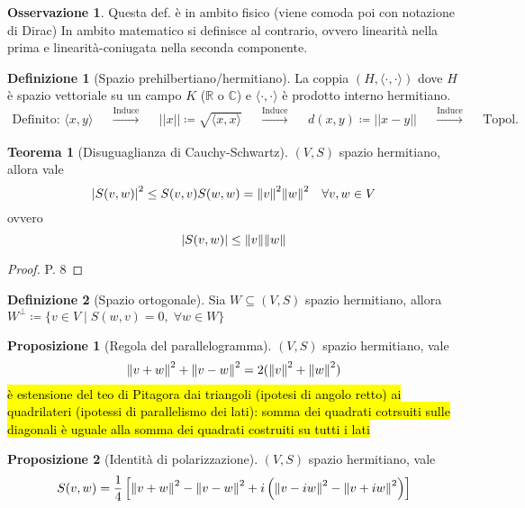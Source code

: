 \documentclass[a4paper,10pt]{article}
\theoremstyle{definition}
\newcommand{\re}{\mathbb{R}} %
\newcommand{\im}{\mathbb{C}} %
\newcommand{\inner}{\langle\cdot{,}\cdot\rangle} %
\newcommand{\inn}[2]{\langle #1, #2 \rangle}
\theoremstyle{indentdefinition}
\newtheorem{defn}{Definizione}[section]
\theoremstyle{indenttheorem}
\newtheorem{thm}{Teorema}
\newtheorem{prop}{Proposizione}
\theoremstyle{myremark}
\newtheorem*{rem*}{Osservazione}
\theoremstyle{indentgeneral}
\begin{document}
\begin{rem*}
    Questa def. è in  ambito fisico (viene comoda poi con notazione di Dirac) In ambito matematico si definisce al contrario, ovvero linearità nella prima e linearità-coniugata nella seconda componente.
\end{rem*}

\begin{defn}[Spazio prehilbertiano/hermitiano]
    La coppia $(H, \inner)$ dove $H$ è spazio vettoriale su un campo $K$ ($\re$ o $\im$)  e $\inner$ è prodotto interno hermitiano. 
    \begin{align*}
        \text{Definito: } \inn{x}{y}  & & \overset{\text{Induce}}{\longrightarrow} 
& & ||x|| \coloneqq \sqrt{\inn{x}{x}} & & \overset{\text{Induce}}{\longrightarrow} & & d(x,y) \coloneqq ||x-y||  & & \overset{\text{Induce}}{\longrightarrow} & & \text{Topol.}
    \end{align*}
\end{defn}

\begin{thm}[Disuguaglianza di Cauchy-Schwartz]\label{thm-dis-cauchy-schwartz}
    $(V,S)$ spazio hermitiano, allora vale $$\abs{S(v,w)}^2\le S(v,v)S(w,w)=\norm{v}^2\norm{w}^2\quad\forall v,w\in V$$
    ovvero $$\abs{S(v,w)}\le \norm{v}\norm{w}$$
\end{thm}

\begin{proof}P. 8
\end{proof}

\begin{defn}[Spazio ortogonale]
    Sia $W\subseteq (V,S)$ spazio hermitiano, allora $W^\perp\coloneqq\{v\in V\mid S(w,v)=0,\;\forall w\in W\}$
\end{defn}

\begin{prop}[Regola del parallelogramma]
    $(V,S)$ spazio hermitiano, vale $$\norm{v+w}^2+\norm{v-w}^2=2(\norm{v}^2+\norm{w}^2)$$
    \hl{è estensione del teo di Pitagora dai triangoli (ipotesi di angolo retto) ai quadrilateri (ipotessi di parallelismo dei lati): somma dei quadrati cotrsuiti sulle diagonali è uguale alla somma dei quadrati costruiti su tutti i lati}
\end{prop}



\begin{prop}[Identità di polarizzazione]\label{prop-identità-polarizzazione}
    $(V,S)$ spazio hermitiano, vale 
    $$S(v,w)=\frac{1}{4}\left[\norm{v+w}^2-\norm{v-w}^2+i\left(\norm{v-iw}^2-\norm{v+iw}^2\right)\right]$$
\end{prop}
\end{document}
